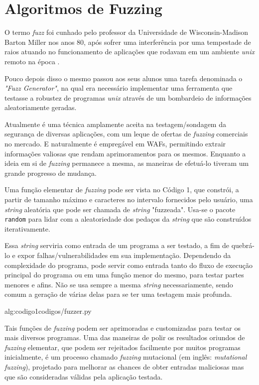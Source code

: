 \section{Algoritmos de Fuzzing}

O termo \textit{fuzz} foi cunhado pelo professor da Universidade de Wisconsin-Madison Barton Miller nos anos 80, após sofrer uma interferência por uma tempestade de raios atuando no funcionamento de aplicações que rodavam em um ambiente \textit{unix} remoto na época \cite{fuzzing_info}. 

Pouco depois disso o mesmo passou aos seus alunos uma tarefa denominada o \textit{"Fuzz Generator"}, na qual era necessário implementar uma ferramenta que testasse a robustez de programas \textit{unix} através de um bombardeio de informações aleatoriamente geradas.

Atualmente é uma técnica amplamente aceita na testagem/sondagem da segurança de diversas aplicações, com um leque de ofertas de \textit{fuzzing} comerciais no mercado. E naturalmente é empregável em WAFs, permitindo extrair informações valiosas que rendam aprimoramentos para os mesmos. Enquanto a ideia em si de \textit{fuzzing} permanece a mesma, as maneiras de efetuá-lo tiveram um grande progresso de mudança.


Uma função elementar de \textit{fuzzing} pode ser vista no Código 1, que constrói, a partir de tamanho máximo e caracteres no intervalo fornecidos pelo usuário, uma \textit{string} aleatória que pode ser chamada de \textit{string} "fuzzeada". Usa-se o pacote \verb+random+ para lidar com a aleatoriedade dos pedaços da \textit{string} que são construídos iterativamente. 

Essa \textit{string} serviria como entrada de um programa a ser testado, a fim de quebrá-lo e expor falhas/vulnerabilidades em sua implementação. Dependendo da complexidade do programa, pode servir como entrada tanto do fluxo de execução principal do programa ou em uma função menor do mesmo, para testar partes menores e afins. Não se usa sempre a mesma \textit{string} necessariamente, sendo comum a geração de várias delas para se ter uma testagem mais profunda.

 {alg:codigo1}{codigos/fuzzer.py}

\bigskip
Tais funções de \textit{fuzzing} podem ser aprimoradas e customizadas para testar os mais diversos programas. Uma das maneiras de polir os resultados oriundos de \textit{fuzzing} elementar, que podem ser rejeitados facilmente por muitos programas inicialmente, é um processo chamado \textit{fuzzing} mutacional (em inglês: \textit{mutational fuzzing}), projetado para melhorar as chances de obter entradas maliciosas mas que são consideradas válidas pela aplicação testada.

